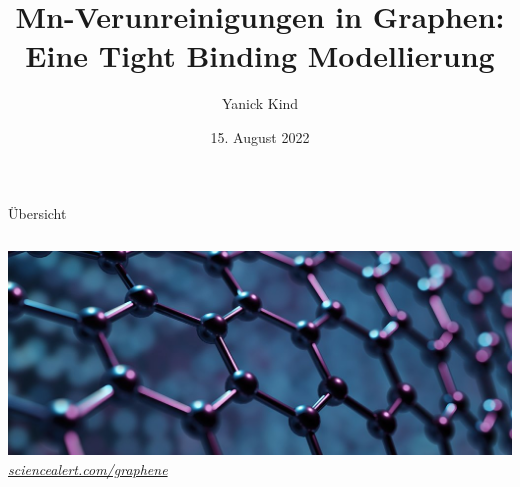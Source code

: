 \documentclass[aspectratio=1610, 9pt, xcolor=dvipsnames]{beamer}
\title{Mn-Verunreinigungen in Graphen: Eine
Tight Binding Modellierung}
\author[Y.~Kind]{Yanick Kind}
\institute[AG Anders]{AG Anders \\  Fakultät Physik}
\date{15. August 2022}
\begin{document}
\maketitle

\begin{frame}{Übersicht}
  \begin{columns}
    \setlength{\parskip}{4ex}
    \tableofcontents
    \vspace*{1cm}
    \centering
    \includegraphics[width = \textwidth]{Plots/rendering.jpg}
    \hspace*{12pt}\hbox{\scriptsize {\footnotesize\itshape \href{https://www.sciencealert.com/graphene}{sciencealert.com/graphene}}}
  \end{columns}
\end{frame}
\end{document}

